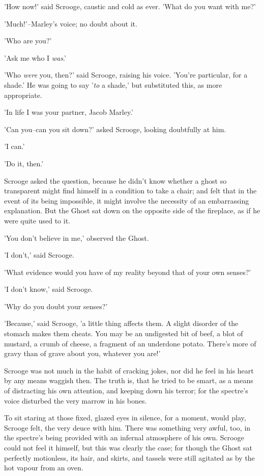 'How now!' said Scrooge, caustic and cold as ever. 'What do you want
with me?'

'Much!'--Marley's voice; no doubt about it.

'Who are you?'

'Ask me who I \emph{was}.'

'Who \emph{were} you, then?' said Scrooge, raising his voice. 'You're
particular, for a shade.' He was going to say '\emph{to} a shade,' but
substituted this, as more appropriate.

'In life I was your partner, Jacob Marley.'

'Can you--can you sit down?' asked Scrooge, looking doubtfully at him.

'I can.'

'Do it, then.'

Scrooge asked the question, because he didn't know whether a ghost so
transparent might find himself in a condition to take a chair; and felt
that in the event of its being impossible, it might involve the
necessity of an embarrassing explanation. But the Ghost sat down on the
opposite side of the fireplace, as if he were quite used to it.

'You don't believe in me,' observed the Ghost.

'I don't,' said Scrooge.

'What evidence would you have of my reality beyond that of your own
senses?'

'I don't know,' said Scrooge.

'Why do you doubt your senses?'

'Because,' said Scrooge, 'a little thing affects them. A slight disorder
of the stomach makes them cheats. You may be an undigested bit of beef,
a blot of mustard, a crumb of cheese, a fragment of an underdone potato.
There's more of gravy than of grave about you, whatever you are!'

Scrooge was not much in the habit of cracking jokes, nor did he feel in
his heart by any means waggish then. The truth is, that he tried to be
smart, as a means of distracting his own attention, and keeping down his
terror; for the spectre's voice disturbed the very marrow in his bones.

To sit staring at those fixed, glazed eyes in silence, for a moment,
would play, Scrooge felt, the very deuce with him. There was something
very awful, too, in the spectre's being provided with an infernal
atmosphere of his own. Scrooge could not feel it himself, but this was
clearly the case; for though the Ghost sat perfectly motionless, its
hair, and skirts, and tassels were still agitated as by the hot vapour
from an oven.

